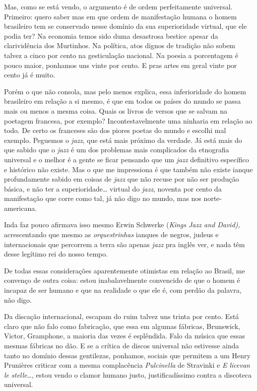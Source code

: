 Mas, como se está vendo, o argumento é de ordem perfeitamente universal.
Primeiro: quero saber mas em que ordem de manifestação humana o homem
brasileiro tem se conservado nesse domínio da sua superioridade virtual,
que ele podia ter? Na economia temos sido duma desastrosa bestice apesar
da clarividência dos Murtinhos. Na política, atos dignos de tradição não
sobem talvez a cinco por cento na gesticulação nacional. Na poesia a
porcentagem é pouco maior, ponhamos uns vinte por cento. E pras artes em
geral vinte por cento já é muito.

Porém o que não consola, mas pelo menos explica, essa inferioridade do
homem brasileiro em relação a si mesmo, é que em todos os países do
mundo se passa mais ou menos a mesma coisa. Quais os livros de versos
que se salvam na poetagem francesa, por exemplo? Incontestavelmente uma
ninharia em relação ao todo. De certo os franceses são dos piores poetas
do mundo e escolhi mal exemplo. Peguemos o \textit{jazz}, que está mais
próximo da verdade. Já está mais do que sabido que o \textit{jazz} é um
dos problemas mais complicados da etnografia universal e o melhor é a
gente se ficar pensando que um \textit{jazz} definitivo específico e
histórico não existe. Mas o que me impressiona é que também não existe
ianque profundamente sabido em coisas de \textit{jazz} que não recuse por
não ser produção básica, e não ter a superioridade\ldots{} virtual do
\textit{jazz}, noventa por cento da manifestação que corre como tal, já
não digo no mundo, mas nos norte-americana.

Inda faz pouco afirmava isso mesmo Erwin Schwerke (\textit{Kings Jazz and
David),} acrescentando que mesmo as \textit{orquestrinhas} ianques de negros,
judeus e internacionais que percorrem a terra são apenas \textit{jazz} pra
inglês ver, e nada têm desse legítimo rei do nosso tempo.

De todas essas considerações aparentemente otimistas em relação ao
Brasil, me convenço de outra coisa: estou inabalavelmente convencido de
que o homem é incapaz de ser humano e que na realidade o que ele é, com
perdão da palavra, não digo.

Da discação internacional, escapam do ruim talvez uns trinta por cento.
Está claro que não falo como fabricação, que essa em algumas fábricas,
Brunswick, Victor, Gramphone, a maioria das vezes é esplêndida. Falo da
música que essas mesmas fábricas no dão. E se a crítica de discos
universal não estivesse ainda tanto no domínio dessas gentilezas,
ponhamos, sociais que permitem a um Henry Prunières criticar com a mesma
complacência \textit{Pulcinella} de Stravinki e \textit{E licevan le stelle}\ldots{}, estou
vendo o clamor humano justo, justificadíssimo contra a discoteca
universal.

